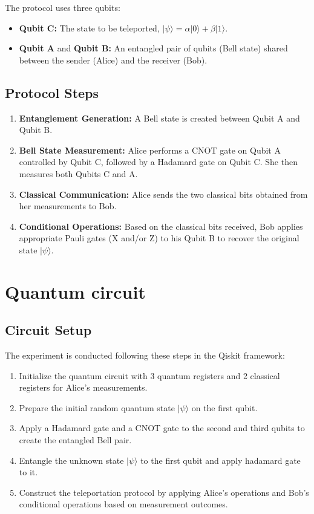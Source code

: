\documentclass[12pt]{article}
\begin{document}
The protocol uses three qubits:
\begin{itemize}
    \item \textbf{Qubit C:} The state to be teleported, $|\psi\rangle = \alpha|0\rangle + \beta|1\rangle$.
    \item \textbf{Qubit A} and \textbf{Qubit B:} An entangled pair of qubits (Bell state) shared between the sender (Alice) and the receiver (Bob).
\end{itemize}
\newpage
\subsection{Protocol Steps}
\begin{enumerate}
    \item \textbf{Entanglement Generation:} A Bell state is created between Qubit A and Qubit B.
    \item \textbf{Bell State Measurement:} Alice performs a CNOT gate on Qubit A controlled by Qubit C, followed by a Hadamard gate on Qubit C. She then measures both Qubits C and A.
    \item \textbf{Classical Communication:} Alice sends the two classical bits obtained from her measurements to Bob.
    \item \textbf{Conditional Operations:} Based on the classical bits received, Bob applies appropriate Pauli gates (X and/or Z) to his Qubit B to recover the original state $|\psi\rangle$.
\end{enumerate}

\section{Quantum circuit}
\subsection{Circuit Setup}
The experiment is conducted following these steps in the Qiskit framework:
\begin{enumerate}
    \item Initialize the quantum circuit with 3 quantum registers and 2 classical registers for Alice's measurements.
    \item Prepare the initial random quantum state $|\psi\rangle$ on the first qubit.
    \item Apply a Hadamard gate and a CNOT gate to the second and third qubits to create the entangled Bell pair.
    \item Entangle the unknown state $|\psi\rangle$ to the first qubit and apply hadamard gate to it.
    \item Construct the teleportation protocol by applying Alice's operations and Bob's conditional operations based on measurement outcomes.
\end{enumerate}
\end{document}
